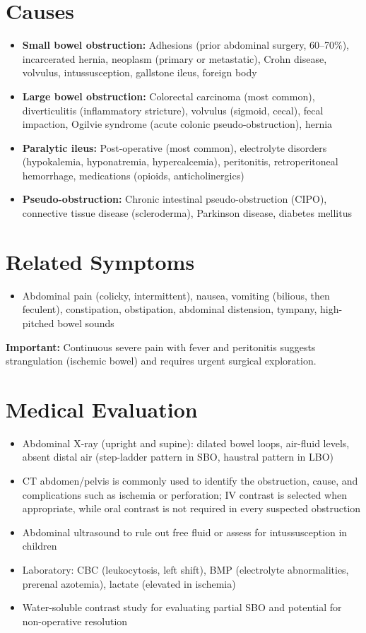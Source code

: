 \section*{Causes}
\begin{itemize}
  \item \textbf{Small bowel obstruction:} Adhesions (prior abdominal surgery, 60--70\%), incarcerated hernia, neoplasm (primary or metastatic), Crohn disease, volvulus, intussusception, gallstone ileus, foreign body
  \item \textbf{Large bowel obstruction:} Colorectal carcinoma (most common), diverticulitis (inflammatory stricture), volvulus (sigmoid, cecal), fecal impaction, Ogilvie syndrome (acute colonic pseudo-obstruction), hernia
  \item \textbf{Paralytic ileus:} Post-operative (most common), electrolyte disorders (hypokalemia, hyponatremia, hypercalcemia), peritonitis, retroperitoneal hemorrhage, medications (opioids, anticholinergics)
  \item \textbf{Pseudo-obstruction:} Chronic intestinal pseudo-obstruction (CIPO), connective tissue disease (scleroderma), Parkinson disease, diabetes mellitus
\end{itemize}

\section*{Related Symptoms}
\begin{itemize}
  \item Abdominal pain (colicky, intermittent), nausea, vomiting (bilious, then feculent), constipation, obstipation, abdominal distension, tympany, high-pitched bowel sounds
\end{itemize}
\textbf{Important:} Continuous severe pain with fever and peritonitis suggests strangulation (ischemic bowel) and requires urgent surgical exploration.

\section*{Medical Evaluation}
\begin{itemize}
  \item Abdominal X-ray (upright and supine): dilated bowel loops, air-fluid levels, absent distal air (step-ladder pattern in SBO, haustral pattern in LBO)
  \item CT abdomen/pelvis is commonly used to identify the obstruction, cause, and complications such as ischemia or perforation; IV contrast is selected when appropriate, while oral contrast is not required in every suspected obstruction
  \item Abdominal ultrasound to rule out free fluid or assess for intussusception in children
  \item Laboratory: CBC (leukocytosis, left shift), BMP (electrolyte abnormalities, prerenal azotemia), lactate (elevated in ischemia)
  \item Water-soluble contrast study for evaluating partial SBO and potential for non-operative resolution
\end{itemize}

